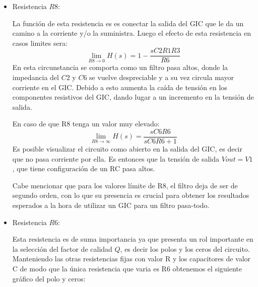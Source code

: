\begin{itemize}
    \item Resistencia $R8$:
    
    La función de esta resistencia es es conectar la salida del GIC que le da un camino a la corriente y/o la suministra. Luego el efecto de esta resistencia en casos limites sera:
    $$\lim_{R8 \longrightarrow 0} H(s) = 1 - \frac{sC2R1R3}{R6}$$
    En esta circunstancia se comporta como un filtro pasa altos, donde la impedancia del $C2$ y $C6$ se vuelve despreciable y a su vez  circula mayor corriente en el GIC. Debido a esto aumenta la caída de tensión en los componentes resistivos del GIC, dando lugar a un incremento en la tensión de salida. 
    
    En caso de que R8 tenga un valor muy elevado:
    $$\lim_{R8\longrightarrow\infty} H(s) = \frac{sC6R6}{sC6R6 + 1}$$
    Es posible visualizar el circuito como abierto en la salida del GIC, es decir que no pasa corriente por ella. Es entonces que la tensión de salida $Vout = V1$, que tiene configuración de un RC pasa altos. 
    
    Cabe mencionar que para los valores límite de R8, el filtro deja de ser de segundo orden, con lo que su presencia es crucial para obtener los resultados esperados a la hora de utilizar un GIC para un filtro pasa-todo.
    
    \item Resistencia $R6$:
    
    Esta resistencia es de suma importancia ya que presenta un rol importante en la selección del factor de calidad $Q$, es decir los polos y los ceros del circuito. Manteniendo las otras resistencias fijas con valor R y los capacitores de valor C de modo que la única resistencia que varia es R6 obtenemos el siguiente gráfico del polo y ceros:
    

\end{itemize}
